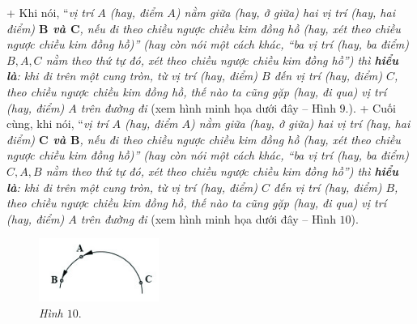 	\vskip 0.1cm
	+ Khi nói, “\textit{vị trí $A$ (\textnormal{hay}, điểm $A$) nằm giữa (\textnormal{hay}, ở giữa) hai vị trí (\textnormal{hay}, hai điểm) \textbf{\color{toancuabi}$\pmb B$ và $\pmb C$}, nếu đi theo chiều ngược chiều kim đồng hồ (\textnormal{hay}, xét theo chiều ngược chiều kim đồng hồ)” (\textnormal{hay còn} nói một cách khác, “ba vị trí (\textnormal{hay}, ba điểm) $B, A, C$ nằm theo thứ tự đó, xét theo chiều ngược chiều kim đồng hồ”) thì \textbf{\color{toancuabi}hiểu là}: khi đi trên một cung tròn, từ vị trí (\textnormal{hay}, điểm) $B$ đến vị trí (\textnormal{hay}, điểm) $C$, theo chiều ngược chiều kim đồng hồ, thế nào ta cũng gặp (\textnormal{hay}, đi qua) vị trí (\textnormal{hay}, điểm) $A$ trên đường đi} (xem hình minh họa dưới đây -- Hình $9.$).
	\vskip 0.1cm
	+ Cuối cùng, khi nói, “\textit{vị trí $A$ (\textnormal{hay}, điểm $A$) nằm giữa (\textnormal{hay}, ở giữa) hai vị trí (\textnormal{hay}, hai điểm) \textbf{\color{toancuabi}$\pmb C$ và $\pmb B$}, nếu đi theo chiều ngược chiều kim đồng hồ (\textnormal{hay}, xét theo chiều ngược chiều kim đồng hồ)” (\textnormal{hay còn} nói một cách khác, “ba vị trí (\textnormal{hay}, ba điểm) $C, A, B$ nằm theo thứ tự đó, xét theo chiều ngược chiều kim đồng hồ”) thì \textbf{\color{toancuabi}hiểu là}: khi đi trên một cung tròn, từ vị trí (\textnormal{hay}, điểm) $C$ đến vị trí (\textnormal{hay}, điểm) $B$, theo chiều ngược chiều kim đồng hồ, thế nào ta cũng gặp (\textnormal{hay}, đi qua) vị trí (\textnormal{hay}, điểm) $A$ trên đường đi} (xem hình minh họa dưới đây -- Hình $10$).
	\vskip 0.1cm
	\begin{figure}
		\centering
		\vspace*{-10pt}
		\captionsetup{labelformat= empty, justification=centering}
		\includegraphics[width=0.35\textwidth]{pic10}
		\caption{\small\textit{Hình $10.$}}
		\vspace*{-10pt}
	\end{figure}
